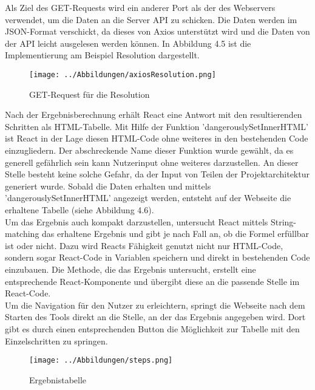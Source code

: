 Als Ziel des GET-Requests wird ein anderer Port als der des Webservers verwendet, um die Daten an die Server API zu schicken. Die Daten werden im JSON-Format verschickt, da dieses von Axios unterstützt wird und die Daten von der API leicht ausgelesen werden können. In Abbildung 4.5 ist die Implementierung am Beispiel Resolution dargestellt.
\begin{figure}[H]
     \centerline{\texttt{[image: ../Abbildungen/axiosResolution.png]}}
  \caption{GET-Request für die Resolution}
  \label{fig1_1}
\end{figure}
Nach der Ergebnisberechnung erhält React eine Antwort mit den resultierenden Schritten als HTML-Tabelle. Mit Hilfe der Funktion 'dangerouslySetInnerHTML' ist React in der Lage diesen HTML-Code ohne weiteres in den bestehenden Code einzugliedern. Der abschreckende Name dieser Funktion wurde gewählt, da es generell gefährlich sein kann Nutzerinput ohne weiteres darzustellen. An dieser Stelle besteht keine solche Gefahr, da der Input von Teilen der Projektarchitektur generiert wurde.
Sobald die Daten erhalten und mittels 'dangerouslySetInnerHTML' angezeigt werden, entsteht auf der Webseite die erhaltene Tabelle (siehe Abbildung 4.6).\\
Um das Ergebnis auch kompakt darzustellen, untersucht React mittels String-matching das erhaltene Ergebnis und gibt je nach Fall an, ob die Formel erfüllbar ist oder nicht. Dazu wird Reacts Fähigkeit genutzt nicht nur HTML-Code, sondern sogar React-Code in Variablen speichern und direkt in bestehenden Code einzubauen. Die Methode, die das Ergebnis untersucht, erstellt eine entsprechende React-Komponente und übergibt diese an die passende Stelle im React-Code. \\
Um die Navigation für den Nutzer zu erleichtern, springt die Webseite nach dem Starten des Tools direkt an die Stelle, an der das Ergebnis angegeben wird. Dort gibt es durch einen entsprechenden Button die Möglichkeit zur Tabelle mit den Einzelschritten zu springen.
\begin{figure}[!htb]
     \centerline{\texttt{[image: ../Abbildungen/steps.png]}}
  \caption{Ergebnistabelle}
  \label{fig1_1}
\end{figure}
